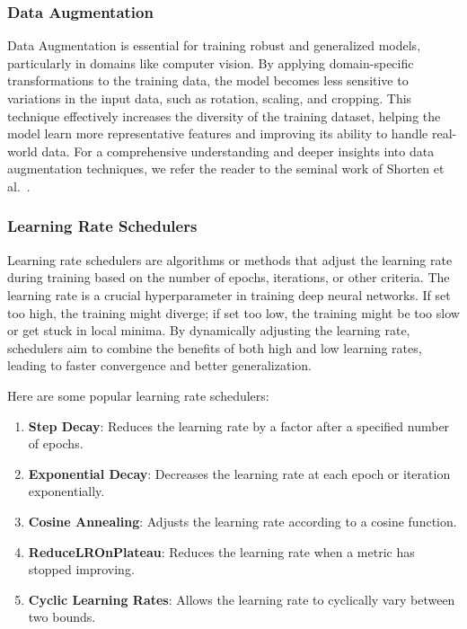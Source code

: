 \subsubsection*{Data Augmentation}

Data Augmentation is essential for training robust and generalized models, particularly in domains like computer vision. By applying domain-specific transformations to the training data, the model becomes less sensitive to variations in the input data, such as rotation, scaling, and cropping. This technique effectively increases the diversity of the training dataset, helping the model learn more representative features and improving its ability to handle real-world data. For a comprehensive understanding and deeper insights into data augmentation techniques, we refer the reader to the seminal work of Shorten et al.~\cite{Shorten2019ASO}.
\subsubsection*{Learning Rate Schedulers}

Learning rate schedulers are algorithms or methods that adjust the learning rate during training based on the number of epochs, iterations, or other criteria. The learning rate is a crucial hyperparameter in training deep neural networks. If set too high, the training might diverge; if set too low, the training might be too slow or get stuck in local minima. By dynamically adjusting the learning rate, schedulers aim to combine the benefits of both high and low learning rates, leading to faster convergence and better generalization.

Here are some popular learning rate schedulers:

\begin{enumerate}
    \item \textbf{Step Decay}: Reduces the learning rate by a factor after a specified number of epochs.
    \item \textbf{Exponential Decay}: Decreases the learning rate at each epoch or iteration exponentially.
    \item \textbf{Cosine Annealing}: Adjusts the learning rate according to a cosine function.
    \item \textbf{ReduceLROnPlateau}: Reduces the learning rate when a metric has stopped improving.
    \item \textbf{Cyclic Learning Rates}: Allows the learning rate to cyclically vary between two bounds.
\end{enumerate}

